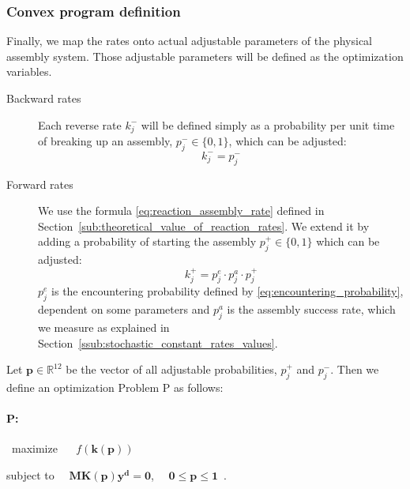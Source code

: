 
        \subsubsection{Convex program definition} %
        \label{ssub:convex_program_definition}

        Finally, we map the rates onto actual adjustable parameters of the physical
        assembly system. Those adjustable parameters will be defined as the optimization variables.

        \begin{description}
            \item[Backward rates] Each reverse rate $k_j^-$ will be defined simply as a probability
            per unit time of breaking up an assembly, $p_j^- \in \{0, 1\}$, which can be
            adjusted:
            \begin{equation} \label{eq:backward_rate_opt}
                k_j^- = p_j^-
            \end{equation}
            \item[Forward rates] We use the formula \eqref{eq:reaction_assembly_rate} defined in Section~\ref{sub:theoretical_value_of_reaction_rates}. We extend it by adding a probability of starting the assembly $p_j^+  \in \{0, 1\}$ which can be adjusted:
            \begin{equation} \label{eq:forward_rate_opt}
                k_j^+ = p^e_j \cdot p^a_j \cdot p_j^+
            \end{equation}
            $p_j^e$ is the encountering probability defined by \eqref{eq:encountering_probability}, dependent on some parameters and $p_j^a$ is the assembly success rate, which we measure as explained in Section~\ref{ssub:stochastic_constant_rates_values}.
        \end{description}

        Let $\mathbf{p} \in \mathbb{R}^{12}$ be the vector of all adjustable
        probabilities, $p_j^+$ and $p_j^-$. Then we define an optimization Problem P as follows:

        \paragraph{P:} ~maximize ~~ $f(\mathbf{k(p)})$

        \vspace{1.5mm}

        \hspace{2.5mm} subject to ~~$\mathbf{M}\mathbf{K(p)}\mathbf{y^d} =
        \mathbf{0}$, ~~$\mathbf{0} \leq \mathbf{p} \leq \mathbf{1}$~.
        \vspace{2mm}

